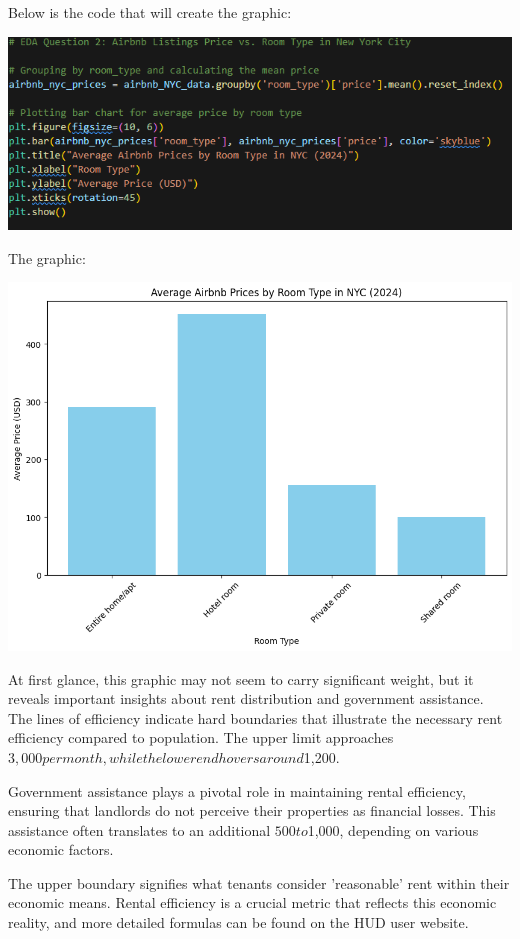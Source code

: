 \documentclass[a4paper]{article}
\begin{document}
\begin{enumerate}
\begin{enumerate}
    Below is the code that will create the graphic: 

    \includegraphics[scale=0.75]{Saagnik-Hypothesis-2-code.png}

    The graphic:

    \includegraphics[scale=0.65]{Saagnik-Hypothesis-2.png}

    At first glance, this graphic may not seem to carry significant weight, but it reveals important insights about rent distribution and government assistance. The lines of efficiency indicate hard boundaries that illustrate the necessary rent efficiency compared to population. The upper limit approaches $3,000 per month, while the lower end hovers around $1,200. 

    Government assistance plays a pivotal role in maintaining rental efficiency, ensuring that landlords do not perceive their properties as financial losses. This assistance often translates to an additional $500 to $1,000, depending on various economic factors.

    The upper boundary signifies what tenants consider 'reasonable' rent within their economic means. Rental efficiency is a crucial metric that reflects this economic reality, and more detailed formulas can be found on the HUD user website. 


\end{enumerate}
\end{enumerate}
\end{document}
